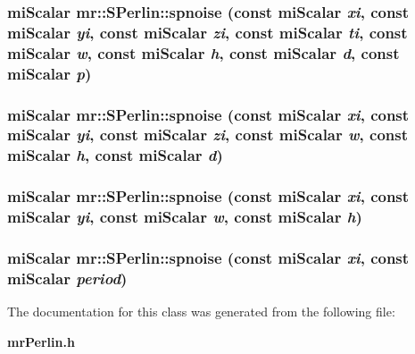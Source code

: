 \subsubsection{\setlength{\rightskip}{0pt plus 5cm}mi\-Scalar mr::SPerlin::spnoise (const mi\-Scalar {\em xi}, const mi\-Scalar {\em yi}, const mi\-Scalar {\em zi}, const mi\-Scalar {\em ti}, const mi\-Scalar {\em w}, const mi\-Scalar {\em h}, const mi\-Scalar {\em d}, const mi\-Scalar {\em p})\hspace{0.3cm}{\tt  [inline, static]}}\label{classmr_1_1SPerlin_e24}


\subsubsection{\setlength{\rightskip}{0pt plus 5cm}mi\-Scalar mr::SPerlin::spnoise (const mi\-Scalar {\em xi}, const mi\-Scalar {\em yi}, const mi\-Scalar {\em zi}, const mi\-Scalar {\em w}, const mi\-Scalar {\em h}, const mi\-Scalar {\em d})\hspace{0.3cm}{\tt  [inline, static]}}\label{classmr_1_1SPerlin_e23}


\subsubsection{\setlength{\rightskip}{0pt plus 5cm}mi\-Scalar mr::SPerlin::spnoise (const mi\-Scalar {\em xi}, const mi\-Scalar {\em yi}, const mi\-Scalar {\em w}, const mi\-Scalar {\em h})\hspace{0.3cm}{\tt  [inline, static]}}\label{classmr_1_1SPerlin_e22}


\subsubsection{\setlength{\rightskip}{0pt plus 5cm}mi\-Scalar mr::SPerlin::spnoise (const mi\-Scalar {\em xi}, const mi\-Scalar {\em period})\hspace{0.3cm}{\tt  [inline, static]}}\label{classmr_1_1SPerlin_e21}




The documentation for this class was generated from the following file:\begin{CompactItemize}
\item 
{\bf mr\-Perlin.h}\end{CompactItemize}
